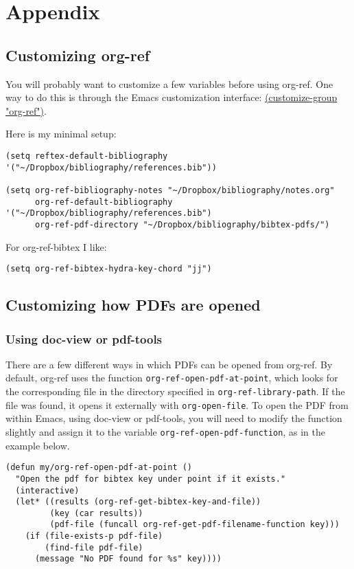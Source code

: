 \documentclass[11pt]{article}
\begin{document}
{\section{Appendix}
\label{sec-3}
\subsection{Customizing org-ref}
\label{sec-3-1}

You will probably want to customize a few variables before using org-ref. One way to do this is through the Emacs customization interface: \url{(customize-group "org-ref")}.

Here is my minimal setup:
\begin{verbatim}
(setq reftex-default-bibliography '("~/Dropbox/bibliography/references.bib"))

(setq org-ref-bibliography-notes "~/Dropbox/bibliography/notes.org"
      org-ref-default-bibliography '("~/Dropbox/bibliography/references.bib")
      org-ref-pdf-directory "~/Dropbox/bibliography/bibtex-pdfs/")
\end{verbatim}

For org-ref-bibtex I like:

\begin{verbatim}
(setq org-ref-bibtex-hydra-key-chord "jj")
\end{verbatim}

\subsection{Customizing how PDFs are opened}
\label{sec-3-2}
\subsubsection{Using doc-view or pdf-tools}
\label{sec-3-2-1}

There are a few different ways in which PDFs can be opened from org-ref. By default, org-ref uses the function \verb~org-ref-open-pdf-at-point~, which looks for the corresponding file in the directory specified in \verb~org-ref-library-path~. If the file was found, it opens it externally with \verb~org-open-file~. To open the PDF from within Emacs, using doc-view or pdf-tools, you will need to modify the function slightly and assign it to the variable \verb~org-ref-open-pdf-function~, as in the example below.

\begin{verbatim}
(defun my/org-ref-open-pdf-at-point ()
  "Open the pdf for bibtex key under point if it exists."
  (interactive)
  (let* ((results (org-ref-get-bibtex-key-and-file))
         (key (car results))
         (pdf-file (funcall org-ref-get-pdf-filename-function key)))
    (if (file-exists-p pdf-file)
        (find-file pdf-file)
      (message "No PDF found for %s" key))))


\end{verbatim}}
\end{document}
